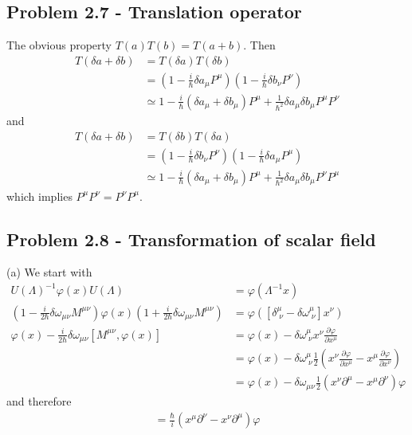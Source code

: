 \documentclass[../main.tex]{subfiles}
\begin{document}
\subsection{Problem 2.7 - Translation operator}
The obvious property $T(a)T(b)=T(a+b)$. Then
\begin{align}
T(\delta a+\delta b)&=T(\delta a)T(\delta b)\\
&=\left(1-\frac{i}{\hbar}\delta a_\mu P^\mu\right)\left(1-\frac{i}{\hbar}\delta b_\nu P^\nu\right)\\
&\simeq 1-\frac{i}{\hbar}(\delta a_\mu +\delta b_\mu) P^\mu+\frac{1}{\hbar^2}\delta a_\mu\delta b_\mu P^\mu P^\nu
\end{align}
and 
\begin{align}
T(\delta a+\delta b)&=T(\delta b)T(\delta a)\\
&=\left(1-\frac{i}{\hbar}\delta b_\nu P^\nu\right)\left(1-\frac{i}{\hbar}\delta a_\mu P^\mu\right)\\
&\simeq 1-\frac{i}{\hbar}(\delta a_\mu +\delta b_\mu) P^\mu+\frac{1}{\hbar^2}\delta a_\mu\delta b_\mu P^\nu P^\mu
\end{align}
which implies $P^\mu P^\nu=P^\nu P^\mu$.

\subsection{Problem 2.8 - Transformation of scalar field}
(a) We start with
\begin{align}
U(\Lambda)^{-1}\varphi(x)U(\Lambda)&=\varphi(\Lambda^{-1}x)\\
\left(1-\frac{i}{2\hbar}\delta\omega_{\mu\nu}M^{\mu\nu}\right)\varphi(x)\left(1+\frac{i}{2\hbar}\delta\omega_{\mu\nu}M^{\mu\nu}\right)&=\varphi([\delta^\mu_{\;\nu}-\delta\omega^\mu_{\;\nu}]x^\nu)\\
\varphi(x)-\frac{i}{2\hbar}\delta\omega_{\mu\nu}[M^{\mu\nu},\varphi(x)]&=\varphi(x)-\delta\omega^\mu_{\;\nu}x^\nu\frac{\partial\varphi}{\partial x^\mu}\\
&=\varphi(x)-\delta\omega^\mu_{\;\nu}\frac{1}{2}\left(x^\nu\frac{\partial\varphi}{\partial x^\mu}-x^\mu\frac{\partial\varphi}{\partial x^\nu}\right)\\
&=\varphi(x)-\delta\omega_{\mu\nu}\frac{1}{2}\left(x^\nu\partial^\mu-x^\mu\partial^\nu\right)\varphi
\end{align}
and therefore
\begin{align}
[\varphi,M^{\mu\nu}]=\frac{\hbar}{i}(x^\mu\partial^\nu-x^\nu\partial^\mu)\varphi
\end{align}
\end{document}
